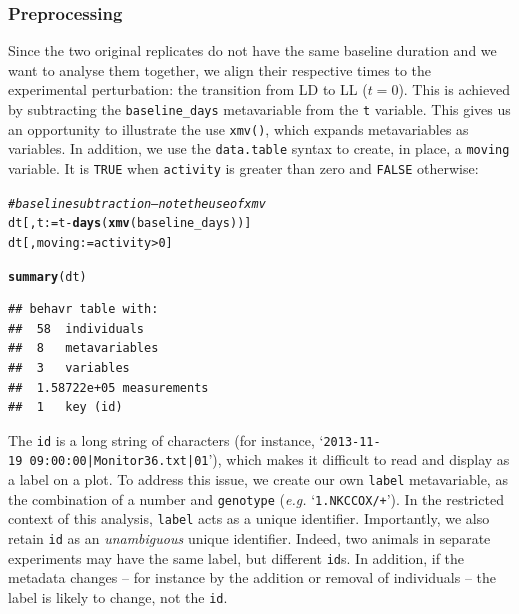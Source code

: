 \documentclass[10pt,letterpaper]{article}\usepackage[]{graphicx}\usepackage[]{color}
\makeatletter
\newcommand{\hlnum}[1]{\textcolor[rgb]{0.686,0.059,0.569}{#1}}%
\newcommand{\hlcom}[1]{\textcolor[rgb]{0.678,0.584,0.686}{\textit{#1}}}%
\newcommand{\hlopt}[1]{\textcolor[rgb]{0,0,0}{#1}}%
\newcommand{\hlstd}[1]{\textcolor[rgb]{0.345,0.345,0.345}{#1}}%
\newcommand{\hlkwb}[1]{\textcolor[rgb]{0.69,0.353,0.396}{#1}}%
\newcommand{\hlkwd}[1]{\textcolor[rgb]{0.737,0.353,0.396}{\textbf{#1}}}%
\newenvironment{kframe}{%
 \def\at@end@of@kframe{}%
 \ifinner\ifhmode%
  \def\at@end@of@kframe{\end{minipage}}%
  \begin{minipage}{\columnwidth}%
 \fi\fi%
 \def\FrameCommand##1{\hskip\@totalleftmargin \hskip-\fboxsep
 \colorbox{shadecolor}{##1}\hskip-\fboxsep
     \hskip-\linewidth \hskip-\@totalleftmargin \hskip\columnwidth}%
 \MakeFramed {\advance\hsize-\width
   \@totalleftmargin\z@ \linewidth\hsize
   \@setminipage}}%
 {\par\unskip\endMakeFramed%
 \at@end@of@kframe}
\newenvironment{knitrout}{}{} %
\makeatother
\begin{document}
\subsubsection*{Preprocessing}
Since the two original replicates do not have the same baseline duration and we want to analyse them together,
we align their respective times to the experimental perturbation: the transition from LD to LL ($t = 0$). 
This is achieved by subtracting the \texttt{baseline\_days} metavariable from the \texttt{t} variable.
This gives us an opportunity to illustrate the use \texttt{xmv()}, which expands metavariables as variables.
In addition, we use the \texttt{data.table} syntax to create, in place, a \texttt{moving} variable.
It is \texttt{TRUE} when \texttt{activity} is greater than zero and \texttt{FALSE} otherwise:

\begin{knitrout}
\color{fgcolor}\begin{kframe}
\begin{alltt}
\hlcom{# baseline subtraction -- note the use of xmv}
\hlstd{dt[,t} \hlkwb{:=} \hlstd{t} \hlopt{-} \hlkwd{days}\hlstd{(}\hlkwd{xmv}\hlstd{(baseline_days))]}
\hlstd{dt[, moving} \hlkwb{:=}  \hlstd{activity} \hlopt{>} \hlnum{0}\hlstd{]}
\end{alltt}
\end{kframe}
\end{knitrout}

\begin{knitrout}
\color{fgcolor}\begin{kframe}
\begin{alltt}
\hlkwd{summary}\hlstd{(dt)}
\end{alltt}
\begin{verbatim}
## behavr table with:
##  58	individuals
##  8	metavariables
##  3	variables
##  1.58722e+05	measurements
##  1	key (id)
\end{verbatim}
\end{kframe}
\end{knitrout}

The \texttt{id} is a long string of characters (for instance, `\texttt{2013-11-19~09:00:00|Monitor36.txt|01}'), 
which makes it difficult to read and display as a label on a plot.
To address this issue, we create our own \texttt{label} metavariable, as the combination of a number and \texttt{genotype} (\emph{e.g.} `\texttt{1.NKCCOX/+}').
In the restricted context of this analysis, \texttt{label} acts as a unique identifier.
Importantly, we also retain \texttt{id} as an \emph{unambiguous} unique identifier.
Indeed, two animals in separate experiments may have the same label, but different \texttt{id}s.
In addition, if the metadata changes -- for instance by the addition or removal of individuals -- the label is likely to change, not the \texttt{id}.
\end{document}
